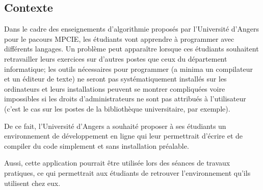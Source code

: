 \vspace*{\fill}
\begingroup

\begin{center}
\section*{Contexte}
\end{center}
 
\par Dans le cadre des enseignements d'algorithmie proposés par l'Université d'Angers pour le pacours MPCIE, les étudiants vont apprendre à programmer avec différents langages. Un problème peut apparaître lorsque ces étudiants souhaitent retravailler leurs exercices sur d'autres postes que ceux du département informatique; les outils nécessaires pour programmer (a minima un compilateur et un éditeur de texte) ne seront pas systématiquement installés sur les ordinateurs et leurs installations peuvent se montrer compliquées voire impossibles si les droits d'administrateurs ne sont pas attribués à l'utilisateur (c'est le cas sur les postes de la bibliothèque universitaire, par exemple).

\par De ce fait, l'Université d'Angers a souhaité proposer à ses étudiants un environnement de développement en ligne qui leur permettrait d'écrire et de compiler du code simplement et sans installation préalable.

\par Aussi, cette application pourrait être utilisée lors des séances de travaux pratiques, ce qui permettrait aux étudiants de retrouver l'environnement qu'ils utilisent chez eux.
 
\endgroup
\vspace*{\fill}